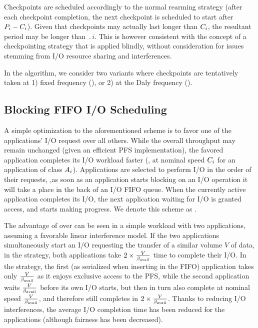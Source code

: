 Checkpoints are scheduled accordingly to the normal rearming strategy
(\ie after each checkpoint completion, the next checkpoint is scheduled
to start after $P_{i}-C_{i}$). Given that checkpoints may actually
last longer than $C_{i}$, the resultant period may be longer than
$\period{i}$. This is however consistent with the concept of a
checkpointing strategy that is applied blindly, without consideration
for issues stemming from I/O resource sharing and interferences.

In the \nocoop algorithm, we consider two variants where checkpoints are
tentatively taken at 1) fixed frequency (\propfixed), or 2) at the
Daly frequency (\propdaly).

\subsection{Blocking \fifoblock FIFO I/O Scheduling}

A simple optimization to the aforementioned scheme is to favor one of
the applications' I/O request over all others. While the overall throughput
may remain unchanged (given an efficient PFS implementation), the favored
application completes its I/O workload faster (\ie, at nominal speed
$C_{i}$ for an application of class $A_{i}$).
Applications are selected to perform I/O in the order of their requests,
\ie ,as soon as an application starts blocking on an I/O operation it will
take a place in the back of an  I/O FIFO queue. When the currently
active application completes its I/O, the next application waiting for I/O
is granted access, and starts making progress. We denote this scheme as
\fifoblock.

The advantage of \fifoblock over \nocoop can be seen in a simple workload with two
applications, assuming a favorable linear interference model.
If the two applications simultaneously start an I/O requesting the
transfer of a similar volume $V$ of data, in the \nocoop strategy,
both applications take $2 \times \frac{V}{\beta_{\text{avail}}}$ time to complete
their I/O. In the \fifoblock strategy, the first (as serialized when
inserting in the FIFO) application takes only $\frac{V}{\beta_{\text{avail}}}$
as it enjoys exclusive access to the PFS, while the second application
waits $\frac{V}{\beta_{\text{avail}}}$ before its own I/O starts, but then in turn
also complete at nominal speed $\frac{V}{\beta_{\text{avail}}}$, and therefore still
completes in $2 \times \frac{V}{\beta_{\text{avail}}}$. Thanks
to reducing I/O interferences, the average I/O completion time
has been reduced for the applications (although fairness has been decreased).


